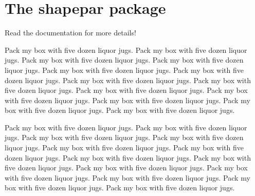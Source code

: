 \documentclass[article]{memoir}
\begin{document}
\chapter*{The \textsf{shapepar} package}

Read the documentation for more details!

\vfill

\shapepar{\heartshape} Pack my box with five dozen liquor jugs. Pack my box with five dozen liquor jugs. Pack my box with five dozen liquor jugs. Pack my box with five dozen liquor jugs. Pack my box with five dozen liquor jugs. Pack my box with five dozen liquor jugs. Pack my box with five dozen liquor jugs. Pack my box with five dozen liquor jugs. Pack my box with five dozen liquor jugs. Pack my box with five dozen liquor jugs. Pack my box with five dozen liquor jugs. Pack my box with five dozen liquor jugs. Pack my box with five dozen liquor jugs.

\vfill

\shapepar{\nutshape} Pack my box with five dozen liquor jugs. Pack my box with five dozen liquor jugs. Pack my box with five dozen liquor jugs. Pack my box with five dozen liquor jugs. Pack my box with five dozen liquor jugs. Pack my box with five dozen liquor jugs. Pack my box with five dozen liquor jugs. Pack my box with five dozen liquor jugs. Pack my box with five dozen liquor jugs. Pack my box with five dozen liquor jugs. Pack my box with five dozen liquor jugs. Pack my box with five dozen liquor jugs. Pack my box with five dozen liquor jugs.
\end{document}

